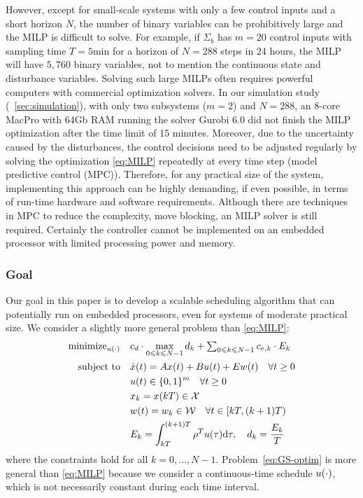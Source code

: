 However, except for small-scale systems with only a few control inputs and a short horizon $N$, the number of binary variables can be prohibitively large and the MILP is difficult to solve.
For example, if $\Sigma_b$ has %
$m=20$ control inputs with sampling time $T = 5 \text{min}$ for a horizon of $N = 288$ steps in $24$ hours, the MILP will have $5 \comma 760$ binary variables, not to mention the continuous state and disturbance variables.
Solving such large MILPs often requires powerful computers with commercial optimization
solvers.
In our simulation study (~\cref{sec:simulation}), with only two subsystems ($m=2$) and $N=288$, an 8-core MacPro with 64Gb RAM running the %
solver Gurobi 6.0 did not finish the MILP optimization after the time limit of 15 minutes.
Moreover, due to the uncertainty caused by the disturbances, the control decisions need to be adjusted regularly by solving the optimization \eqref{eq:MILP} repeatedly at every time step (model predictive control (MPC)).
Therefore, for any practical size of the system, implementing this approach can be highly demanding, if even possible, in terms of run-time hardware and software requirements.
Although there are techniques in MPC to reduce the complexity, \eg move blocking, an MILP solver is still required.
Certainly the controller cannot be implemented on an embedded processor with limited processing power and memory.

\subsubsection{Goal}

Our goal in this paper is to develop a scalable %
scheduling algorithm that can potentially run on embedded processors, even for systems of moderate practical size.
We consider a slightly more general problem than \eqref{eq:MILP}:
\begin{align}
  \operatorname{minimize}_{u (\cdot)} \quad & c_d \cdot \max_{0 \leqslant k \leqslant
  N - 1} d_k + \textstyle\sum_{0 \leqslant k \leqslant N - 1} c_{e, k} \cdot E_k 
  \label{eq:GS-optim}\\
  \text{subject to} \quad
  & \dot{x} (t) = Ax (t) + Bu (t) + Ew (t) \quad \forall t \geq 0 \nonumber\\
  & u(t) \in \{0,1\}^{m} \quad \forall t \geq 0 \nonumber\\
  & x_{k} = x (kT) \in \mathcal{X} \nonumber\\
  & w (t) = w_{k} \in \mathcal{W} \quad \forall t \in [kT, (k + 1) T) \nonumber\\
  & E_k = \int_{kT}^{(k + 1) T} \rho^{T} u(\tau) \mathrm{d} \tau, \quad d_k = \frac{E_k}{T} \nonumber
\end{align}
where the constraints hold for all $k = 0, \ldots, N - 1$.
Problem~\eqref{eq:GS-optim} is more general than \eqref{eq:MILP} because we consider a
continuous-time schedule $u (\cdot)$, which is not necessarily constant
during each time interval.



